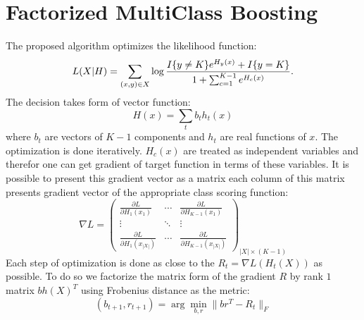 \documentclass{article}
\begin{document}
\section{Factorized MultiClass Boosting}
The proposed algorithm optimizes the likelihood function:
\begin{multline*}
	L(X\arrowvert H) = \sum_{(x,y) \in X} \log \frac{ I\{y \ne K \}e^{H_y(x)} + I\{y=K\} }{ 1+\sum_{c=1}^{K-1} e^{H_c(x)} }.
\end{multline*}
The decision takes form of vector function:
\begin{equation}
H(x) = \sum_t b_{t} h_t(x) 
\end{equation}
where $b_t$ are vectors of $K-1$ components and $h_t$ are real functions of $x$. The optimization is done iteratively. $H_c(x)$ are treated as independent variables and therefor one can get gradient of target function in terms of these variables. It is possible to present this gradient vector as a matrix each column of this matrix presents gradient vector of the appropriate class scoring function:
\begin{equation}
\nabla L = 
\left(
\begin{array}{ccc}
	  \frac{ \partial L }{ \partial H_{1}(x_{1}) } 
	& \cdots 
	& \frac{ \partial L }{ \partial H_{K-1}(x_{1}) } \\

	  \vdots & \ddots & \vdots\\

	  \frac{ \partial L }{ \partial H_{1}(x_{|X|}) } 
	& \cdots 
	& \frac{ \partial L }{ \partial H_{K-1}(x_{|X|}) }
\end{array}
\right)_{|X| \times (K-1)}
\end{equation}
Each step of optimization is done as close to the $R_t = \nabla L(H_t(X))$ as possible. To do so we factorize the matrix form of the gradient $R$ by rank $1$ matrix $b h(X)^T$ using Frobenius distance as the metric:
\begin{equation}
(b_{t+1},r_{t+1}) = \arg \min_{b,r} \|b r^T - R_t\|_F
\label{eq:factorization_step}
\end{equation}
\end{document}
